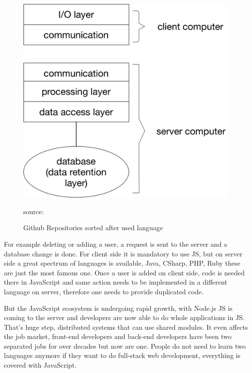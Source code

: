 \begin{figure}[hb]
	\centering
	\includegraphics[scale=0.5]{bilder/grundlagen/Three-Tier.png}
	\caption{Github Repositories sorted after used language} source:\cite{JS}
	\label{fig:JS}
\end{figure}
For example deleting or adding a user, a request is sent to the server and a database change is done. For client side it is mandatory to use \gls{JS}, but on server side  a great spectrum of languages is available, Java, CSharp, PHP, Ruby these are just the most famous one. Once a user is added on client side, code is needed there in JavaScript and same action needs to be implemented in a different language on server, therefore one needs to provide duplicated code.

But the JavaScript ecosystem is undergoing rapid growth, with Node.js \gls{JS} is coming to the server and developers are now able to do whole applications in \gls{JS}. That's huge step, distributed systems that can use shared modules. It even affects the job market, front-end developers and back-end developers have been two separated jobs for over decades but now are one. People do not need to learn two languages anymore if they want to do full-stack web development, everything is covered with JavaScript.


